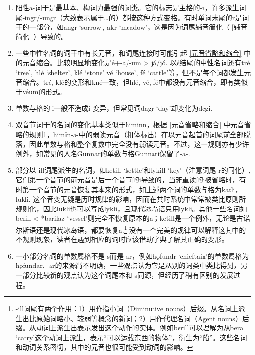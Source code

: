 \begin{enumerate}
  \item
        阳性a-词干是最基本、构词力最强的词类。它的标志是主格的-r，许多派生词尾-ingr/-ungr（大致表示属于\ldots 的）都按这种方式变格。有时单词末尾的r是词干的一部分，如angr
        `sorrow', akr
        `meadow'，这是因为词尾辅音简化（ \ref{辅音简化} ）导致的。
  \item
        一些中性名词的词干中有长元音，和词尾连接时可能引起 \ref{元音省略和缩合} 中的元音缩合。比较明显地变化是é+-a/-um
        \textgreater{} já/jó. 以é结尾的中性名词还有tré `tree', hlé `shelter',
        klé `stone' vé `house', fé
        `cattle'等，但不是每个词都发生元音缩合。tré,
        klé的变形和kné一致，但hlé, vé,
        fé中都没有元音缩合，即有类似于véum的形式。
  \item
        单数与格的-i一般不造成i-变异，但常见词dagr `day'却变化为degi.
  \item
        双音节词干的名词的变化基本类似于himinn，根据 \ref{元音省略和缩合} 中元音省略的规则1，him\textbf{i}n-a-中的弱读元音（粗体标出）在以元音起首的词尾前全部脱落，因此单数与格和整个复数中完全没有弱读元音。不过，这一规则亦有少许例外，如常见的人名Gunnar的单数与格Gunnari保留了-a-.
  \item
        部分以-ill词尾派生的名词，如ketill `kettle'和lykill
        `key'（注意词尾-r的同化）,
        它们第一个音节的前元音是后一个音节的i导致的，当非重读的i被省略时，有时第一个音节的元音恢复其本来的形式，如上述两个词的单数与格为katli，lukli.
        这个音变无疑是历时规律的影响，因而在共时系统中常常被类比原则所规则化，因此lukli也可以写成lykli，且现代冰岛语只用lykli。其他一些名词如berill
        \textless{} *barilaz
        `vessel'则完全不恢复原本的a；ketill是一个例外，无论是古诺尔斯语还是现代冰岛语，都要恢复a.\footnote{-ill词尾有两个作用：1）用作指小词（Diminutive
          nouns）后缀。从名词上派生出比原始词略小、较弱等概念的新词；2）用作代理名词（Agent
          nouns）后缀。从动词上派生出表示发出这个动作的实体。例如berill可以理解为从bera
          `carry'这个动词上派生，表示``可以运载东西的物体''，衍生为``船''。这些名词和动词关系密切，其中的元音也很可能受到动词的影响。}
        没有一个完美的规律可以解释这其中的不规则现象，读者在遇到相应的词时应该借助字典了解其正确的变形。
  \item
        一小部分名词的单数属格不是-s而是-ar，例如hǫfundr
        `chieftain'的单数属格为hǫfundar.
        -ar的来源尚不明确，一些观点认为它是从别的词类中类比得到，另一部分比较新的观点认为这个词尾本和-s同源，但经历了稍有区别的发展过程。
\end{enumerate}


